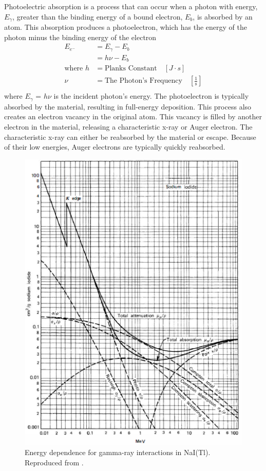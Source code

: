 Photoelectric absorption is a process that can occur when a photon with energy, $E_{\gamma}$, greater than the binding energy of a bound electron, $E_{b}$, is absorbed by an atom. This absorption produces a photoelectron, which has the energy of the photon minus the binding energy of the electron
%
\begin{align} \label{eq:photoelectric_effect}
E_{e^{-}} &= E_{\gamma} - E_{b} \\
&= h\nu - E_{b} \\
\text{where } h &= \text{Planks Constant} \quad [J \cdot s] \nonumber \\
\nu &= \text{The Photon's Frequency} \quad \left[\frac{1}{\text{s}}\right] \nonumber \\
\end{align}
%
where $E_{\gamma}$ = $h\nu$ is the incident photon's energy. The photoelectron is typically absorbed by the material, resulting in full-energy deposition. This process also creates an electron vacancy in the original atom. This vacancy is filled by another electron in the material, releasing a characteristic x-ray or Auger electron. The characteristic x-ray can either be reabsorbed by the material or escape. Because of their low energies, Auger electrons are typically quickly reabsorbed.

\begin{figure}[H]
\centering
\includegraphics[width=0.75\linewidth]{images/energy_dependence_interactions}
\caption{Energy dependence for gamma-ray interactions in NaI(Tl). Reproduced from \cite{knoll}.}
\label{fig:energy_dependence_interactions}
\end{figure}

